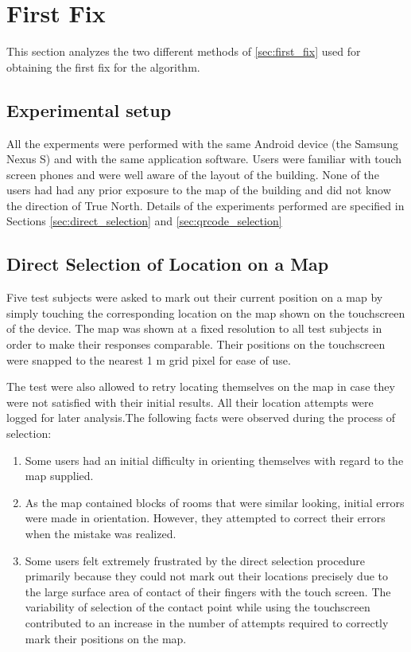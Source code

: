 \section{First Fix}

This section analyzes the two different methods of \ref{sec:first_fix}
used for obtaining the first fix for the algorithm. 

\subsection{Experimental setup}

All the experments were performed with the same Android device (the Samsung 
Nexus S) and with the same application software. Users were familiar with 
touch screen phones and were well aware of the layout of the building. None of
the users had had any prior exposure to the map of the building and did not 
know the direction of True North. Details of the experiments performed 
are specified in Sections \ref{sec:direct_selection} and \ref{sec:qrcode_selection}

\subsection{Direct Selection of Location on a Map\label{sec:direct_selection}}

Five test subjects were asked to mark out their current position on a
map by simply touching the corresponding location on the map shown on the 
touchscreen of the device. The map was shown at a fixed resolution to all 
test subjects in order to make their responses comparable. Their positions 
on the touchscreen were snapped to the nearest 1 m grid pixel for ease of use.

The test were also allowed to retry locating themselves on the map in case they
were not satisfied with their initial results. All their location attempts were
logged for later analysis.The following facts were observed during the process of 
selection:

\begin{enumerate}
\item Some users had an initial difficulty in orienting themselves with regard to 
    the map supplied.
\item As the map contained blocks of rooms that were similar looking,
    initial errors were made in orientation. However, they attempted to 
    correct their errors when the mistake was realized.
\item Some users felt extremely frustrated by the direct selection procedure
    primarily because they could not mark out their locations precisely due
    to the large surface area of contact of their fingers with the touch
    screen. The variability of selection of the contact point while using 
    the touchscreen contributed to an increase in the number of attempts
    required to correctly mark their positions on the map.
\end{enumerate}

